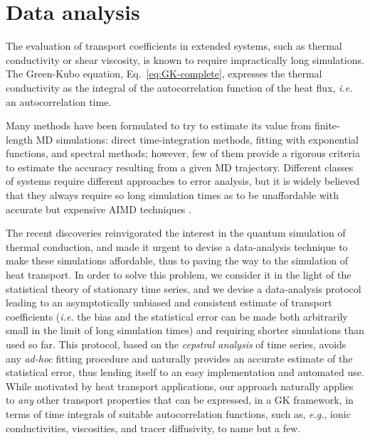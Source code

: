 \chapter{Data analysis}  \label{ch:data-analysis}

\begin{LEtext}
The evaluation of transport coefficients in extended systems, such as thermal conductivity or shear viscosity, is known to require impractically long simulations. The Green-Kubo equation, Eq.~\eqref{eq:GK-complete}, expresses the thermal conductivity as the integral of the autocorrelation function of the heat flux, \emph{i.e.} an autocorrelation time. 

Many methods have been formulated to try to estimate its value from finite-length MD simulations: direct time-integration methods, fitting with exponential functions, and spectral methods; however, few of them provide a rigorous criteria to estimate the accuracy resulting from a given MD trajectory. Different classes of systems require different approaches to error analysis, but it is widely believed that they always require so long simulation times as to be unaffordable with accurate but expensive AIMD techniques \citep{Carbogno:2017gc}. 

The recent discoveries reinvigorated the interest in the quantum simulation of thermal conduction, and made it urgent to devise a data-analysis technique to make these simulations affordable, thus to paving the way to the \abinitio simulation of heat transport.
In order to solve this problem, we consider it in the light of the statistical theory of stationary time series, and we devise a data-analysis protocol leading to an asymptotically unbiased and consistent estimate of transport coefficients (\emph{i.e.} the bias and the statistical error can be made both arbitrarily small in the limit of long simulation times) and requiring shorter simulations than used so far. This protocol, based on the \emph{cepstral analysis} of time series, avoids any \emph{ad-hoc} fitting procedure and naturally provides an accurate estimate of the statistical error, thus lending itself to an easy implementation and automated use. 
While motivated by heat transport applications, our approach naturally applies to \emph{any} other transport properties that can be expressed, in a GK framework, in terms of time integrals of suitable autocorrelation functions, such as, \emph{e.g.}, ionic conductivities, viscosities, and tracer diffusivity, to name but a few. 


\end{LEtext}
